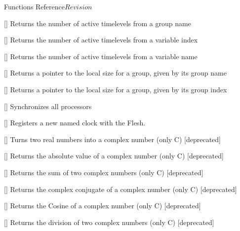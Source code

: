 \begin{cactuspart}{ Functions Reference}{}{$Revision$}
\begin{Lentry}
\item[\code{CCTK\_ActiveTimeLevelsGN}] [\pageref{CCTK-ActiveTimeLevels}]
  Returns the number of active timelevels from a group name

\item[\code{CCTK\_ActiveTimeLevelsVI}] [\pageref{CCTK-ActiveTimeLevels}]
  Returns the number of active timelevels from a variable index

\item[\code{CCTK\_ActiveTimeLevelsVN}] [\pageref{CCTK-ActiveTimeLevels}]
  Returns the number of active timelevels from a variable name

\item[\code{CCTK\_ArrayGroupSize}] [\pageref{CCTK-ArrayGroupSize}]
  Returns a pointer to the local size for a group, given by its group name

\item[\code{CCTK\_ArrayGroupSizeI}] [\pageref{CCTK-ArrayGroupSizeI}]
  Returns a pointer to the local size for a group, given by its group index

\item[\code{CCTK\_Barrier}] [\pageref{CCTK-Barrier}]
  Synchronizes all processors

\item[\code{CCTK\_ClockRegister}] [\pageref{CCTK-ClockRegister}]
  Registers a new named clock with the Flesh.

\item[\code{CCTK\_Cmplx}] [\pageref{CCTK-Cmplx}]
  Turns two real numbers into a complex number (only C) [deprecated]

\item[\code{CCTK\_CmplxAbs}] [\pageref{CCTK-CmplxAbs}]
  Returns the absolute value of a complex number (only C) [deprecated]

\item[\code{CCTK\_CmplxAdd}] [\pageref{CCTK-CmplxAdd}]
  Returns the sum of two complex numbers (only C) [deprecated]

\item[\code{CCTK\_CmplxConjg}] [\pageref{CCTK-CmplxConjg}]
  Returns the complex conjugate of a complex number (only C) [deprecated]

\item[\code{CCTK\_CmplxCos}] [\pageref{CCTK-CmplxCos}]
  Returns the Cosine of a complex number (only C) [deprecated]

\item[\code{CCTK\_CmplxDiv}] [\pageref{CCTK-CmplxDiv}]
  Returns the division of two complex numbers (only C) [deprecated]


\end{Lentry}
\end{cactuspart}

